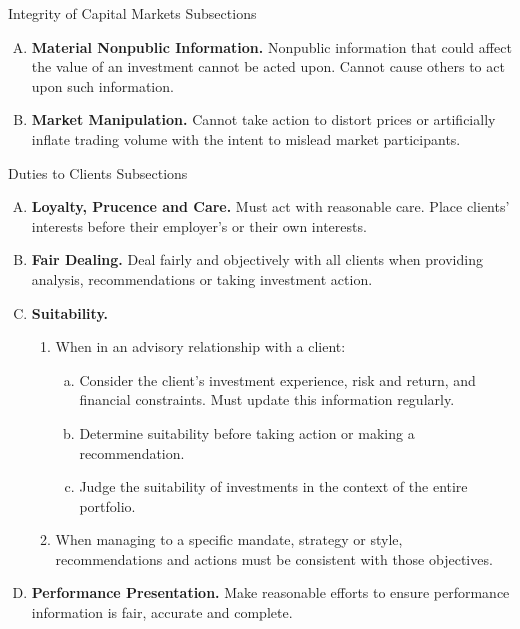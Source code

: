 \documentclass[../custom]{flashcards}
\begin{document}
\begin{flashcard}{Integrity of Capital Markets Subsections}
    \begin{enumerate}[A.]
        \item \textbf{Material Nonpublic Information.} Nonpublic information that could affect the value of an investment cannot be acted upon. Cannot cause others to act upon such information.
        \item \textbf{Market Manipulation.} Cannot take action to distort prices or artificially inflate trading volume with the intent to mislead market participants.
    \end{enumerate}
\end{flashcard}

\begin{flashcard}{Duties to Clients Subsections}
    \begin{enumerate}[A.]
        \item \textbf{Loyalty, Prucence and Care.} Must act with reasonable care. Place clients' interests before their employer's or their own interests.
        \item \textbf{Fair Dealing.} Deal fairly and objectively with all clients when providing analysis, recommendations or taking investment action.
        \item \textbf{Suitability.}
            \begin{enumerate}[1.]
                \item When in an advisory relationship with a client:
                    \begin{enumerate}[a.]
                        \item Consider the client's investment experience, risk and return, and financial constraints. Must update this information regularly.
                        \item Determine suitability before taking action or making a recommendation.
                        \item Judge the suitability of investments in the context of the entire portfolio.
                    \end{enumerate}
                \item When managing to a specific mandate, strategy or style, recommendations and actions must be consistent with those objectives.
            \end{enumerate}
        \item \textbf{Performance Presentation.} Make reasonable efforts to ensure performance information is fair, accurate and complete.

\end{enumerate}
\end{flashcard}
\end{document}
